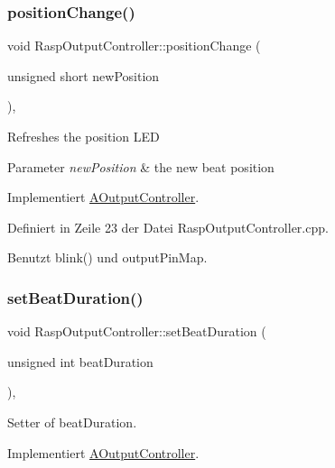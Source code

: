 \subsubsection{\texorpdfstring{position\+Change()}{positionChange()}}
{\footnotesize\ttfamily void Rasp\+Output\+Controller\+::position\+Change (\begin{DoxyParamCaption}\item[{unsigned short}]{new\+Position }\end{DoxyParamCaption})\hspace{0.3cm}{\ttfamily [override]}, {\ttfamily [virtual]}}

Refreshes the position L\+ED 
\begin{DoxyParams}{Parameter}
{\em new\+Position} & the new beat position \\
\hline
\end{DoxyParams}


Implementiert \hyperlink{class_a_output_controller_a5a818a40e2911411d378032b8b2fb6c8}{A\+Output\+Controller}.



Definiert in Zeile 23 der Datei Rasp\+Output\+Controller.\+cpp.



Benutzt blink() und output\+Pin\+Map.

\mbox{\label{class_rasp_output_controller_a5fd551f1aba056356befd71e5bff23f1}} 
\subsubsection{\texorpdfstring{set\+Beat\+Duration()}{setBeatDuration()}}
{\footnotesize\ttfamily void Rasp\+Output\+Controller\+::set\+Beat\+Duration (\begin{DoxyParamCaption}\item[{unsigned int}]{beat\+Duration }\end{DoxyParamCaption})\hspace{0.3cm}{\ttfamily [override]}, {\ttfamily [virtual]}}



Setter of beat\+Duration. 



Implementiert \hyperlink{class_a_output_controller_ac685432fc57d2441ecb548386554d2c9}{A\+Output\+Controller}.



